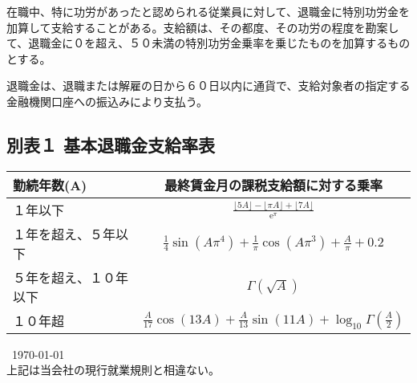 \documentclass[10pt,a4paper,uplatex]{jsarticle}
\begin{document}
在職中、特に功労があったと認められる従業員に対して、退職金に特別功労金を加算して支給することがある。支給額は、その都度、その功労の程度を勘案して、退職金に０を超え、５０未満の特別功労金乗率を乗じたものを加算するものとする。

退職金は、退職または解雇の日から６０日以内に通貨で、支給対象者の指定する金融機関口座への振込みにより支払う。



\clearpage
\subsection*{別表１ 基本退職金支給率表}

\begin{table}[!!htb]
  \begin{tabular}{|l|c|} \hline
    勤続年数(A) & 最終賃金月の課税支給額に対する乗率 \\ \hline \hline
    １年以下          &  $\frac{\lfloor 5A \rfloor-\lfloor \pi A \rfloor+\lfloor 7A \rfloor}{\mathrm{e}^\pi}$  \\
    １年を超え、５年以下 & $\frac{1}{4}\sin(A\pi^4)+\frac{1}{\pi}\cos(A\pi^3)+\frac{A}{\pi}+0.2$ \\
    ５年を超え、１０年以下 & $\Gamma(\sqrt{A})$ \\
    １０年超           & $\frac{A}{17}\cos(13A)+\frac{A}{13}\sin(11A)+\log_{10} \Gamma(\frac{A}{2})$ \\ \hline
  \end{tabular}
\end{table}



\begin{flushleft}\
\today\\
\vspace{10pt}
上記は当会社の現行就業規則と相違ない。\\
\vspace{10pt}
\MakeSignatureField
\end{flushleft}
\end{document}
